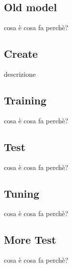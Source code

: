 \subsection{Old model}
cosa è
cosa fa
perchè?
\subsection{Create}
descrizione
\subsection{Training}
cosa è
cosa fa
perchè?
\subsection{Test}
cosa è
cosa fa
perchè?
\subsection{Tuning}
cosa è
cosa fa
perchè?
\subsection{More Test}
cosa è
cosa fa
perchè?